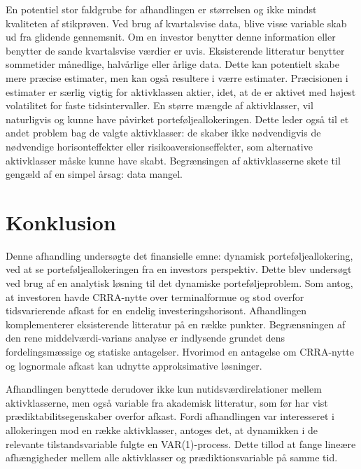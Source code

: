 \documentclass[
  a4paper,
  oneside]{memoir}
\begin{document}
En potentiel stor faldgrube for afhandlingen er størrelsen og ikke mindst kvaliteten af stikprøven. Ved brug af kvartalsvise data, blive visse variable skab ud fra glidende gennemsnit. Om en investor benytter denne information eller benytter de sande kvartalsvise værdier er uvis. Eksisterende litteratur benytter sommetider månedlige, halvårlige eller årlige data. Dette kan potentielt skabe mere præcise estimater, men kan også resultere i værre estimater. Præcisionen i estimater er særlig vigtig for aktivklassen aktier, idet, at de er aktivet med højest volatilitet for faste tidsintervaller. En større mængde af aktivklasser, vil naturligvis og kunne have påvirket porteføljeallokeringen. Dette leder også til et andet problem bag de valgte aktivklasser: de skaber ikke nødvendigvis de nødvendige horisonteffekter eller risikoaversionseffekter, som alternative aktivklasser måske kunne have skabt. Begrænsingen af aktivklasserne skete til gengæld af en simpel årsag: data mangel.

\hypertarget{konklusion}{%
\chapter{Konklusion}\label{konklusion}}

Denne afhandling undersøgte det finansielle emne: dynamisk porteføljeallokering, ved at se porteføljeallokeringen fra en investors perspektiv. Dette blev undersøgt ved brug af en analytisk løsning til det dynamiske porteføljeproblem. Som antog, at investoren havde CRRA-nytte over terminalformue og stod overfor tidsvarierende afkast for en endelig investeringshorisont. Afhandlingen komplementerer eksisterende litteratur på en række punkter. Begrænsningen af den rene middelværdi-varians analyse er indlysende grundet dens fordelingsmæssige og statiske antagelser. Hvorimod en antagelse om CRRA-nytte og lognormale afkast kan udnytte approksimative løsninger.

Afhandlingen benyttede derudover ikke kun nutidsværdirelationer mellem aktivklasserne, men også variable fra akademisk litteratur, som før har vist prædiktabilitsegenskaber overfor afkast. Fordi afhandlingen var interesseret i allokeringen mod en række aktivklasser, antoges det, at dynamikken i de relevante tilstandsvariable fulgte en VAR(1)-process. Dette tillod at fange lineære afhængigheder mellem alle aktivklasser og prædiktionsvariable på samme tid.
\end{document}
